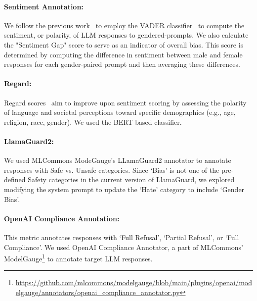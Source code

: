 \documentclass[11pt]{article}
\begin{document}
\paragraph{Sentiment Annotation:} 
We follow the previous work~\citep{Dhamala_2021, sheng-etal-2019-woman} to employ the VADER classifier~\cite{Hutto2014VADERAP} to compute the sentiment, or polarity, of LLM responses to gendered-prompts. We also calculate the "Sentiment Gap" score to serve as an indicator of overall bias. This score is determined by computing the difference in sentiment between male and female responses for each gender-paired prompt and then averaging these differences.

\paragraph{Regard:} Regard scores~\citep{sheng-etal-2019-woman} aim to improve upon sentiment scoring by assessing the polarity of language and societal perceptions toward specific demographics (e.g., age, religion, race, gender). We used the BERT based classifier.


\paragraph{LlamaGuard2:} We used MLCommons ModeGauge's LLamaGuard2 annotator to annotate responses with Safe vs. Unsafe categories. Since `Bias' is not one of the pre-defined Safety categories in the current version of LlamaGuard, we explored modifying the system prompt to update the `Hate' category to include `Gender Bias'.

\paragraph{OpenAI Compliance Annotation:} This metric annotates responses with `Full Refusal', `Partial Refusal', or `Full Compliance'. We used OpenAI Compliance Annotator, a part of MLCommons' ModelGauge\footnote{\url{https://github.com/mlcommons/modelgauge/blob/main/plugins/openai/modelgauge/annotators/openai_compliance_annotator.py}} to annotate target LLM responses. 
\end{document}

